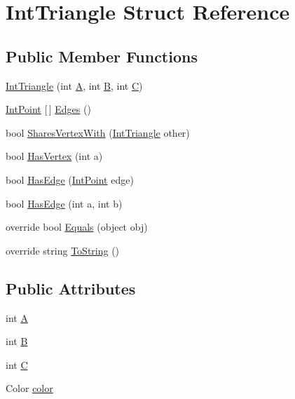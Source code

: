 \hypertarget{struct_int_triangle}{}\section{Int\+Triangle Struct Reference}
\label{struct_int_triangle}
\subsection*{Public Member Functions}
\begin{DoxyCompactItemize}
\item 
\mbox{\hyperlink{struct_int_triangle_abc1bce82e6902934849a0ba922c51a69}{Int\+Triangle}} (int \mbox{\hyperlink{struct_int_triangle_ac469d79ae7703c1bb7b3620b955da00b}{A}}, int \mbox{\hyperlink{struct_int_triangle_a643dc502fac6003f4c76a6c0a983f2dc}{B}}, int \mbox{\hyperlink{struct_int_triangle_a703a8799b3d2ed91c6fd444d028efa3a}{C}})
\item 
\mbox{\hyperlink{struct_int_point}{Int\+Point}} \mbox{[}$\,$\mbox{]} \mbox{\hyperlink{struct_int_triangle_a3ea690497a4287dde9308c49340e33b3}{Edges}} ()
\item 
bool \mbox{\hyperlink{struct_int_triangle_a160ec37ee8e48eb4c9915f37f1db699b}{Shares\+Vertex\+With}} (\mbox{\hyperlink{struct_int_triangle}{Int\+Triangle}} other)
\item 
bool \mbox{\hyperlink{struct_int_triangle_aa6b48615e65989e656c3b4aa757d0e9d}{Has\+Vertex}} (int a)
\item 
bool \mbox{\hyperlink{struct_int_triangle_aaf268beb50585b762048ae524fd85db1}{Has\+Edge}} (\mbox{\hyperlink{struct_int_point}{Int\+Point}} edge)
\item 
bool \mbox{\hyperlink{struct_int_triangle_a29b297e8992bec3a1e6bea98d81b879d}{Has\+Edge}} (int a, int b)
\item 
override bool \mbox{\hyperlink{struct_int_triangle_ae3d7a680e7679f3c29dd92fe05caf4ed}{Equals}} (object obj)
\item 
override string \mbox{\hyperlink{struct_int_triangle_ad0cf63439b025aa03ed28495c1fef0e6}{To\+String}} ()
\end{DoxyCompactItemize}
\subsection*{Public Attributes}
\begin{DoxyCompactItemize}
\item 
int \mbox{\hyperlink{struct_int_triangle_ac469d79ae7703c1bb7b3620b955da00b}{A}}
\item 
int \mbox{\hyperlink{struct_int_triangle_a643dc502fac6003f4c76a6c0a983f2dc}{B}}
\item 
int \mbox{\hyperlink{struct_int_triangle_a703a8799b3d2ed91c6fd444d028efa3a}{C}}
\item 
Color \mbox{\hyperlink{struct_int_triangle_ae9cde6792664a068319a30c3874e57f9}{color}}
\end{DoxyCompactItemize}



